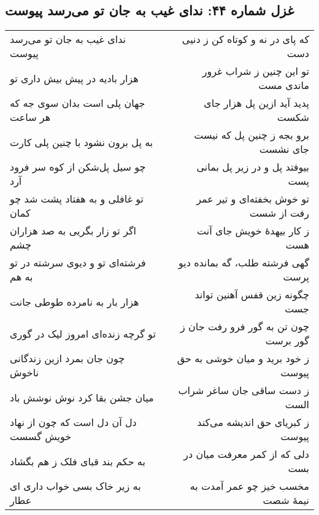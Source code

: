 \begin{center}
\section*{غزل شماره ۴۴: ندای غیب به جان تو می‌رسد پیوست}
\label{sec:044}
\begin{longtable}{l p{0.5cm} r}
ندای غیب به جان تو می‌رسد پیوست
&&
که پای در نه و کوتاه کن ز دنیی دست
\\
هزار بادیه در پیش بیش داری تو
&&
تو این چنین ز شراب غرور ماندی مست
\\
جهان پلی است بدان سوی جه که هر ساعت
&&
پدید آید ازین پل هزار جای شکست
\\
به پل برون نشود با چنین پلی کارت
&&
برو بجه ز چنین پل که نیست جای نشست
\\
چو سیل پل‌شکن از کوه سر فرود آرد
&&
بیوفتد پل و در زیر پل بمانی پست
\\
تو غافلی و به هفتاد پشت شد چو کمان
&&
تو خوش بخفته‌ای و تیر عمر رفت از شست
\\
اگر تو زار بگریی به صد هزاران چشم
&&
ز کار بیهدهٔ خویش جای آنت هست
\\
فرشته‌ای تو و دیوی سرشته در تو به هم
&&
گهی فرشته طلب، گه بمانده دیو پرست
\\
هزار بار به نامرده طوطی جانت
&&
چگونه زین قفس آهنین تواند جست
\\
تو گرچه زنده‌ای امروز لیک در گوری
&&
چون تن به گور فرو رفت جان ز گور برست
\\
چون جان بمرد ازین زندگانی ناخوش
&&
ز خود برید و میان خوشی به حق پیوست
\\
میان جشن بقا کرد نوش نوشش باد
&&
ز دست ساقی جان ساغر شراب الست
\\
دل آن دل است که چون از نهاد خویش گسست
&&
ز کبریای حق اندیشه می‌کند پیوست
\\
به حکم بند قبای فلک ز هم بگشاد
&&
دلی که از کمر معرفت میان در بست
\\
به زیر خاک بسی خواب داری ای عطار
&&
مخسب خیز چو عمر آمدت به نیمهٔ شصت
\\
\end{longtable}
\end{center}
